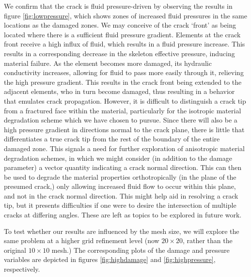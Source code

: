 \documentclass[11pt]{article} %
\begin{document}
We confirm that the crack is fluid pressure-driven by observing the results in figure \ref{fig:lowpressure}, which shows zones of increased fluid pressures in the same locations as the damaged zones. We may conceive of the crack `front' as being located where there is a sufficient fluid pressure gradient. Elements at the crack front receive a high influx of fluid, which results in a fluid pressure increase. This results in a corresponding decrease in the skeleton effective pressure, inducing material failure. As the element becomes more damaged, its hydraulic conductivity increases, allowing for fluid to pass more easily through it, relieving the high pressure gradient. This results in the crack front being extended to the adjacent elements, who in turn become damaged, thus resulting in a behavior that emulates crack propagation. However, it is difficult to distinguish a crack tip from a fractured face within the material, particularly for the isotropic material degradation scheme which we have chosen to pursue. Since there will also be a high pressure gradient in directions normal to the crack plane, there is little that differentiates a true crack tip from the rest of the boundary of the entire damaged zone. This signals a need for further exploration of anisotropic material degradation schemes, in which we might consider (in addition to the damage parameter) a vector quantity indicating a crack normal direction. This can then be used to degrade the material properties orthotropically (in the plane of the presumed crack,) only allowing increased fluid flow to occur within this plane, and not in the crack normal direction. This might help aid in resolving a crack tip, but it presents difficulties if one were to desire the intersection of multiple cracks at differing angles. These are left as topics to be explored in future work.

To test whether our results are influenced by the mesh size, we will explore the same problem at a higher grid refinement level (now $20 \times 20$, rather than the original $10 \times 10$ mesh.) The corresponding plots of the damage and pressure variables are depicted in figures \ref{fig:highdamage} and \ref{fig:highpressure}, respectively.
\end{document}
